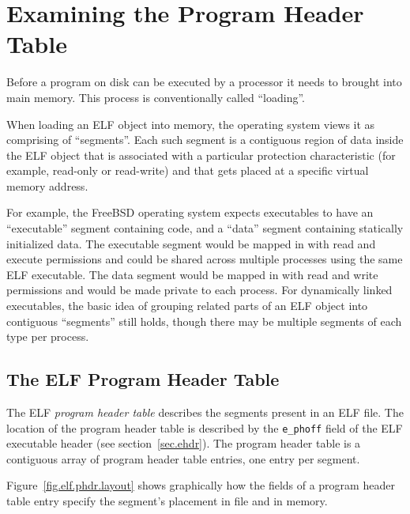\documentclass[a4paper,pdftex]{book}
\newcommand{\firstterm}[1]{\textit{#1}}
\newcommand{\parameter}[1]{\texttt{#1}}
\newcommand{\trade}{\texttrademark\xspace}
\begin{document}
\chapter{Examining the Program Header Table}\label{chap.elf-phdr}

Before a program on disk can be executed by a processor it needs to
brought into main memory.  This process is conventionally called
``loading''.

When loading an ELF object into memory, the operating system views it
as comprising of ``segments''.  Each such segment is a
 contiguous region of data inside
the ELF object that is associated with a particular protection
characteristic (for example, read-only or read-write) and that gets
placed at a specific virtual memory address.

For example, the FreeBSD\trade operating system expects
executables to have an ``executable'' segment containing code, and a
``data'' segment containing statically initialized data.%
%
The executable segment would be mapped in with read and execute
permissions and could be shared across multiple processes using the
same ELF executable.  The data segment would be mapped in with read
and write permissions and would be made private to each process.  For
dynamically linked executables, the basic idea of grouping related
parts of an ELF object into contiguous ``segments'' still holds,
though there may be multiple segments of each type per process.

\section{The ELF Program Header Table}

The ELF \firstterm{program header table}
describes the segments present in an ELF file.  The location of the
program header table is described by the \parameter{e\_phoff} field of
the ELF executable header (see section~\vref{sec.ehdr}).  The program
header table is a contiguous array of program header table entries,
one entry per segment.

Figure~\vref{fig.elf.phdr.layout} shows graphically how the fields of
a program header table entry specify the segment's placement in file
and in memory.
\end{document}
